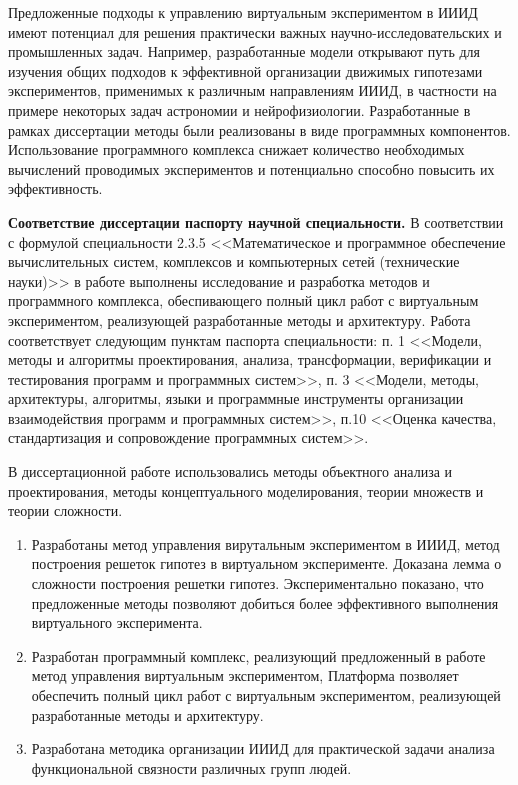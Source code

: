 {\influence} Предложенные подходы к управлению виртуальным экспериментом в ИИИД имеют потенциал для решения практически 
важных научно-исследовательских и промышленных задач. Например, разработанные модели открывают путь для изучения общих 
подходов к эффективной организации движимых гипотезами экспериментов, применимых 
к различным направлениям ИИИД, в частности на примере некоторых задач астрономии и нейрофизиологии.
Разработанные в рамках диссертации методы были реализованы в виде программных компонентов. Использование программного 
комплекса снижает количество необходимых вычислений проводимых экспериментов и потенциально способно 
повысить их эффективность.

\textbf{Соответствие диссертации паспорту научной специальности.}
В соответствии с формулой специальности 2.3.5 <<Математическое и программное обеспечение вычислительных систем, 
комплексов и компьютерных сетей (технические науки)>> в работе выполнены исследование и разработка методов и 
программного комплекса, обеспивающего полный цикл работ с виртуальным экспериментом, 
реализующей разработанные методы и архитектуру. Работа соответствует следующим пунктам паспорта специальности: 
п. 1 <<Модели, методы и алгоритмы проектирования, анализа, трансформации,
верификации и тестирования программ и программных систем>>, п. 3 <<Модели, методы, архитектуры, алгоритмы, 
языки и программные инструменты организации взаимодействия программ и программных систем>>, п.10 <<Оценка качества, 
стандартизация и сопровождение программных систем>>.


{\methods} В диссертационной работе использовались методы объектного анализа и проектирования, методы
концептуального моделирования, теории множеств и теории сложности.

{}
\begin{enumerate}[beginpenalty=10000] %
  \item Разработаны метод управления вирутальным экспериментом в ИИИД, метод построения решеток гипотез в виртуальном 
        эксперименте. Доказана лемма о сложности построения решетки гипотез.  Экспериментально показано, что 
        предложенные методы позволяют добиться более эффективного выполнения виртуального эксперимента.
  \item Разработан программный комплекс, реализующий предложенный в работе метод управления виртуальным экспериментом,
        Платформа позволяет обеспечить полный цикл работ с виртуальным экспериментом, 
        реализующей разработанные методы и архитектуру.
  \item Разработана методика организации ИИИД для практической задачи анализа функциональной связности различных
        групп людей.

\end{enumerate}

